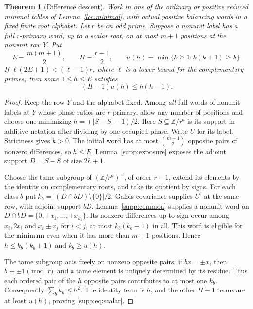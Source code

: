 \documentclass[11pt,a4paper]{article}
\numberwithin{equation}{section}
\newtheorem{theorem}{Theorem}[section]
\begin{document}
\begin{theorem}[Difference descent]\label{supp:descent}
Work in one of the ordinary or positive reduced minimal tables of
Lemma~\ref{loc:minimal}, with actual positive balancing words in a
fixed finite root alphabet. Let $r$ be an odd prime.
Suppose a nonunit label has a full
$r$-primary word, up to a scalar root, on at most $m+1$ positions
at the nonunit row $Y$.
Put
\[
 E=\frac{m(m+1)}2,\qquad H=\frac{r-1}2,\qquad
 u(h)=\min\{k\ge1:k(k+1)\ge h\}.
\]
If $\ell(2E+1)<(\ell-1)r$, where $\ell$ is a lower bound
for the complementary primes, then some $1\le h\le E$ satisfies
\begin{equation}\label{supp:eq:scalar}
                     (H-1)u(h)\le h(h-1).
\end{equation}
\end{theorem}
\begin{proof}
Keep the row $Y$ and the alphabet fixed. Among \emph{all} full words
of nonunit labels at $Y$ whose phase ratios are $r$-primary, allow
any number of positions and choose one minimizing
$h=(|S-S|-1)/2$. Here $S\subseteq\mathbb Z/r^a$ is its support in
additive notation after dividing by one occupied phase. Write $U$
for its label. Strictness gives $h>0$. The initial word has at most
$\binom{m+1}{2}$ opposite pairs of nonzero differences, so $h\le E$.
Lemma~\ref{supp:exposure} exposes the adjoint support $D=S-S$ of
size $2h+1$.

Choose the tame subgroup of $(\mathbb Z/r^a)^\times$, of
order $r-1$, extend its elements by the identity on complementary
roots, and take its quotient by signs. For each class
$b$ put $k_b=|(D\cap bD)\setminus\{0\}|/2$.
Galois covariance supplies $U^b$ at the same row, with
adjoint support $bD$. Lemma~\ref{supp:common} supplies a
nonunit word on
$D\cap bD=\{0,\pm x_1,\ldots,\pm x_{k_b}\}$.
Its nonzero differences up to sign occur among
$x_i,2x_i$ and $x_i\pm x_j$ for $i<j$, at most $k_b(k_b+1)$
in all. This word is eligible for the minimum even when it has
more than $m+1$ positions. Hence $h\le k_b(k_b+1)$ and
$k_b\ge u(h)$.

The tame subgroup acts freely on nonzero opposite pairs:
if $bx=\pm x$, then $b\equiv\pm1\pmod r$, and a tame
element is uniquely determined by its residue. Thus each
ordered pair of the $h$ opposite pairs contributes to at
most one $k_b$. Consequently $\sum_b k_b\le h^2$.
The identity term is $h$, and the other $H-1$ terms are at
least $u(h)$, proving \eqref{supp:eq:scalar}.
\end{proof}
\end{document}
